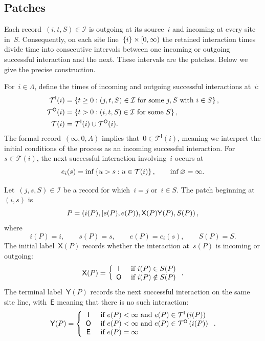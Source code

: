 \documentclass[EJP,preprint,NODS,nobera]{ejpecp}
\begin{document}
\subsection{Patches}
\label{subsec:patches}
Each record~$(i,t,S)\in\mathcal I$ is outgoing at its source~$i$ and incoming
at every site in~$S$. Consequently, on each site line~$\left\{i\right\}\times [0,\infty)$ the retained interaction
times divide time into consecutive intervals between one incoming or outgoing successful
interaction and the next. These intervals are the patches. Below we give the precise construction.

For~$i\in\Lambda$, define the times of incoming and outgoing successful interactions at~$i$:
\begin{align*}
\mathcal T^{\mathsf I}(i)
&=
\left\{t\geq0:(j,t,S)\in\mathcal I
  \text{ for some }j,S\text{ with }i\in S\right\},
\\
\mathcal T^{\mathsf O}(i)
&=
\left\{t>0:(i,t,S)\in\mathcal I\text{ for some }S\right\},
\\
\mathcal T(i)
&=
\mathcal T^{\mathsf I}(i)\cup\mathcal T^{\mathsf O}(i).
\end{align*}
The formal record~$(\infty,0,A)$ implies that~$0\in\mathcal T^{\mathsf I}(i)$, meaning we interpret the initial conditions of the process as an incoming successful interaction.
For~$s\in\mathcal T(i)$, the next successful interaction involving~$i$ occurs
at
\begin{equation*}
e_i(s)
=
\inf\left\{u>s:u\in\mathcal T(i)\right\},
\qquad
\inf\varnothing=\infty.
\end{equation*}

\begin{definition}[Patch]
\label{def:patch}
Let~$(j,s,S)\in\mathcal I$ be a record for which~$i=j$ or~$i\in S$. The patch
beginning at~$(i,s)$ is
\begin{equation*}
P
=
\left(i(P),[s(P),e(P)),\mathsf X(P)\mathsf Y(P),S(P)\right),
\end{equation*}
where
\begin{equation*}
i(P)=i,
\qquad
s(P)=s,
\qquad
e(P)=e_i(s),
\qquad
S(P)=S.
\end{equation*}
The initial label~$\mathsf X(P)$ records whether the interaction at~$s(P)$ is
incoming or outgoing:
\begin{equation*}
\mathsf X(P)
=
\left\{\begin{array}{cl} \mathsf I &\text{ if } i(P)\in S(P) \\ \mathsf O &\text{ if } i(P)\notin S(P) \end{array}\right..
\end{equation*}
The terminal label~$\mathsf Y(P)$ records the next successful interaction on
the same site line, with~$\mathsf E$ meaning that there is no such interaction:
\begin{equation*}
\mathsf Y(P)
=
\left\{\begin{array}{cl} \mathsf I &\text{ if } e(P)<\infty\text{ and }e(P)\in\mathcal T^{\mathsf I}\left(i(P)\right) \\ \mathsf O &\text{ if } e(P)<\infty\text{ and }e(P)\in\mathcal T^{\mathsf O}\left(i(P)\right) \\ \mathsf E &\text{ if } e(P)=\infty \end{array}\right..
\end{equation*}
\end{definition}
\end{document}
